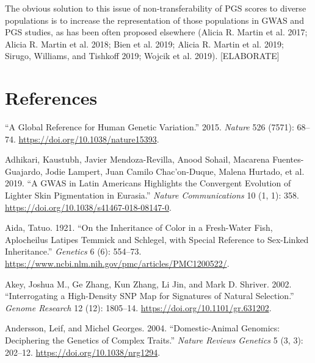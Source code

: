 \documentclass[
]{book}
\newlength{\cslhangindent}
\newlength{\cslentryspacingunit} %
\newenvironment{CSLReferences}[2] %
 {%
  \setlength{\parindent}{0pt}
  \ifodd #1
  \let\oldpar\par
  \def\par{\hangindent=\cslhangindent\oldpar}
  \fi
  \setlength{\parskip}{#2\cslentryspacingunit}
 }%
 {}
\begin{document}
The obvious solution to this issue of non-transferability of PGS scores to diverse populations is to increase the representation of those populations in GWAS and PGS studies, as has been often proposed elsewhere (Alicia R. Martin et al. 2017; Alicia R. Martin et al. 2018; Bien et al. 2019; Alicia R. Martin et al. 2019; Sirugo, Williams, and Tishkoff 2019; Wojcik et al. 2019). {[}ELABORATE{]}

\hypertarget{references}{%
\chapter*{References}\label{references}}

\hypertarget{refs}{}
\begin{CSLReferences}{1}{0}
\leavevmode{}%
{``A Global Reference for Human Genetic Variation.''} 2015. \emph{Nature} 526 (7571): 68--74. \url{https://doi.org/10.1038/nature15393}.

\leavevmode{}%
Adhikari, Kaustubh, Javier Mendoza-Revilla, Anood Sohail, Macarena Fuentes-Guajardo, Jodie Lampert, Juan Camilo Chac'on-Duque, Malena Hurtado, et al. 2019. {``A {GWAS} in {Latin Americans} Highlights the Convergent Evolution of Lighter Skin Pigmentation in {Eurasia}.''} \emph{Nature Communications} 10 (1, 1): 358. \url{https://doi.org/10.1038/s41467-018-08147-0}.

\leavevmode{}%
Aida, Tatuo. 1921. {``On the {Inheritance} of {Color} in a {Fresh-Water Fish}, {Aplocheilus Latipes Temmick} and {Schlegel}, with {Special Reference} to {Sex-Linked Inheritance}.''} \emph{Genetics} 6 (6): 554--73. \url{https://www.ncbi.nlm.nih.gov/pmc/articles/PMC1200522/}.

\leavevmode{}%
Akey, Joshua M., Ge Zhang, Kun Zhang, Li Jin, and Mark D. Shriver. 2002. {``Interrogating a {High-Density SNP Map} for {Signatures} of {Natural Selection}.''} \emph{Genome Research} 12 (12): 1805--14. \url{https://doi.org/10.1101/gr.631202}.

\leavevmode{}%
Andersson, Leif, and Michel Georges. 2004. {``Domestic-Animal Genomics: Deciphering the Genetics of Complex Traits.''} \emph{Nature Reviews Genetics} 5 (3, 3): 202--12. \url{https://doi.org/10.1038/nrg1294}.


\end{CSLReferences}
\end{document}
